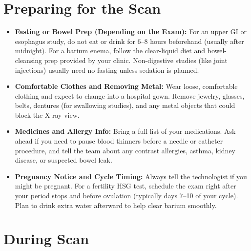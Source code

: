 \section{Preparing for the Scan}

\begin{itemize}
    \item \textbf{Fasting or Bowel Prep (Depending on the Exam):} For an upper GI or esophagus study, do not eat or drink for 6--8 hours beforehand (usually after midnight). For a barium enema, follow the clear-liquid diet and bowel-cleansing prep provided by your clinic. Non-digestive studies (like joint injections) usually need no fasting unless sedation is planned.
    \item \textbf{Comfortable Clothes and Removing Metal:} Wear loose, comfortable clothing and expect to change into a hospital gown. Remove jewelry, glasses, belts, dentures (for swallowing studies), and any metal objects that could block the X-ray view.
    \item \textbf{Medicines and Allergy Info:} Bring a full list of your medications. Ask ahead if you need to pause blood thinners before a needle or catheter procedure, and tell the team about any contrast allergies, asthma, kidney disease, or suspected bowel leak.
    \item \textbf{Pregnancy Notice and Cycle Timing:} Always tell the technologist if you might be pregnant. For a fertility HSG test, schedule the exam right after your period stops and before ovulation (typically days 7--10 of your cycle). Plan to drink extra water afterward to help clear barium smoothly.
\end{itemize}

\section{During Scan}

